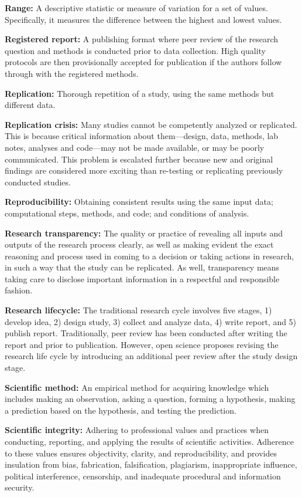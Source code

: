 \documentclass[
]{book}
\begin{document}
\textbf{Range:} A descriptive statistic or measure of variation for a set of values. Specifically, it measures the difference between the highest and lowest values.

\textbf{Registered report:} A publishing format where peer review of the research question and methods is conducted prior to data collection. High quality protocols are then provisionally accepted for publication if the authors follow through with the registered methods.

\textbf{Replication:} Thorough repetition of a study, using the same methods but different data.

\textbf{Replication crisis:} Many studies cannot be competently analyzed or replicated. This is because critical information about them---design, data, methods, lab notes, analyses and code---may not be made available, or may be poorly communicated. This problem is escalated further because new and original findings are considered more exciting than re-testing or replicating previously conducted studies.

\textbf{Reproducibility:} Obtaining consistent results using the same input data; computational steps, methods, and code; and conditions of analysis.

\textbf{Research transparency:} The quality or practice of revealing all inputs and outputs of the research process clearly, as well as making evident the exact reasoning and process used in coming to a decision or taking actions in research, in such a way that the study can be replicated. As well, transparency means taking care to disclose important information in a respectful and responsible fashion.

\textbf{Research lifecycle:} The traditional research cycle involves five stages, 1) develop idea, 2) design study, 3) collect and analyze data, 4) write report, and 5) publish report. Traditionally, peer review has been conducted after writing the report and prior to publication. However, open science proposes revising the research life cycle by introducing an additional peer review after the study design stage.

\textbf{Scientific method:} An empirical method for acquiring knowledge which includes making an observation, asking a question, forming a hypothesis, making a prediction based on the hypothesis, and testing the prediction.

\textbf{Scientific integrity:} Adhering to professional values and practices when conducting, reporting, and applying the results of scientific activities. Adherence to these values ensures objectivity, clarity, and reproducibility, and provides insulation from bias, fabrication, falsification, plagiarism, inappropriate influence, political interference, censorship, and inadequate procedural and information security.
\end{document}
